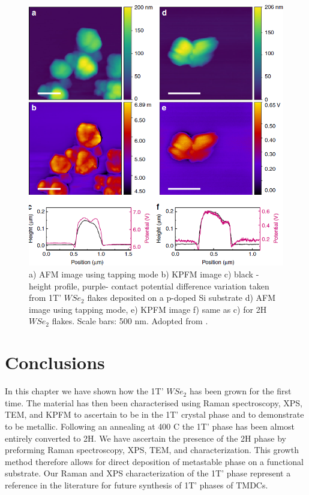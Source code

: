 \begin{figure}[H]
	\begin{center}
		\includegraphics[scale=0.3]{1T'/ElectronicProperties.png}
		\caption{a) AFM image using tapping mode b) KPFM image c) black - height profile, purple- contact potential difference variation taken from 1T’ $WSe_2$ flakes deposited on a p-doped Si substrate d) AFM image using tapping mode, e) KPFM image f) same as c) for 2H $WSe_2$ flakes. Scale bars: 500 nm. Adopted from \cite{Sokolikova2019}.}
		\label{fig:1T'ElectronicProperties}
	\end{center}
\end{figure}

\section{Conclusions}

In this chapter we have shown how the 1T' $WSe_2$ has been grown for the first time. The material has then been characterised using Raman spectroscopy, XPS, TEM, and KPFM to ascertain to be in the 1T’ crystal phase and to demonstrate  to be metallic. Following an annealing at 400 {\degree}C the 1T' phase has been almost entirely converted to 2H. We have ascertain the presence of the 2H phase by preforming Raman spectroscopy, XPS, TEM, and characterization. This growth method therefore allows for direct deposition of metastable phase on a functional substrate. Our Raman and XPS characterization of the 1T’ phase represent a reference in the literature for future synthesis of 1T’ phases of TMDCs.